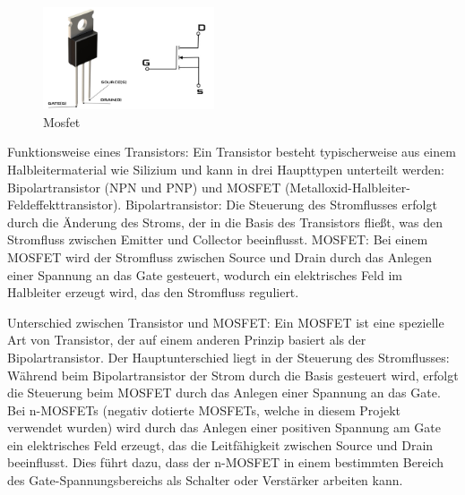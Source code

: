 \begin{figure}[htbp]
	\centering
	\includegraphics[width=0.45\textwidth]{img/Mosfet}
	\caption{Mosfet}
	\label{img:mosfet}
\end{figure}

Funktionsweise eines Transistors: %
Ein Transistor besteht typischerweise aus einem Halbleitermaterial wie Silizium und kann in drei Haupttypen unterteilt
werden: Bipolartransistor (NPN und PNP) und MOSFET (Metalloxid-Halbleiter-Feldeffekttransistor).  \newline
Bipolartransistor: Die Steuerung des Stromflusses erfolgt durch die Änderung des Stroms, der in die Basis des
Transistors fließt, was den Stromfluss zwischen Emitter und Collector beeinflusst. \newline
MOSFET: Bei einem MOSFET wird der Stromfluss zwischen Source und Drain durch das Anlegen einer Spannung an das Gate
gesteuert, wodurch ein elektrisches Feld im Halbleiter erzeugt wird, das den Stromfluss reguliert. \newline

Unterschied zwischen Transistor und MOSFET: \newline %
Ein MOSFET ist eine spezielle Art von Transistor, der auf einem anderen Prinzip basiert als der Bipolartransistor. Der
Hauptunterschied liegt in der Steuerung des Stromflusses: Während beim Bipolartransistor der Strom durch die Basis
gesteuert wird, erfolgt die Steuerung beim MOSFET durch das Anlegen einer Spannung an das Gate.
Bei n-MOSFETs (negativ dotierte MOSFETs, welche in diesem Projekt verwendet wurden) wird durch das Anlegen einer %
positiven Spannung am Gate ein
elektrisches Feld erzeugt, das die Leitfähigkeit zwischen Source und Drain beeinflusst. Dies führt dazu, dass der n-MOSFET
in einem bestimmten Bereich des Gate-Spannungsbereichs als Schalter oder Verstärker arbeiten kann. \newline

